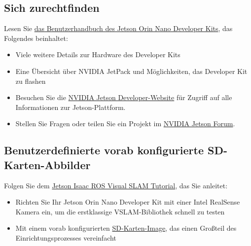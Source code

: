 \documentclass{article}
\begin{document}
\subsection*{Sich zurechtfinden}

Lesen Sie \textcolor{blue}{\href{https://developer.nvidia.com/embedded/learn/jetson-orin-nano-devkit-user-guide/index.html}{das Benutzerhandbuch des Jetson Orin Nano Developer Kits}}, das Folgendes beinhaltet:
\begin{itemize}
    \item Viele weitere Details zur Hardware des Developer Kits
    \item Eine Übersicht über NVIDIA JetPack und Möglichkeiten, das Developer Kit zu flashen
    \item Besuchen Sie die \textcolor{blue}{\href{https://developer.nvidia.com/embedded-computing}{NVIDIA Jetson Developer-Website}} für Zugriff auf alle Informationen zur Jetson-Plattform.
    \item Stellen Sie Fragen oder teilen Sie ein Projekt im \textcolor{blue}{\href{https://forums.developer.nvidia.com/c/agx-autonomous-machines/jetson-embedded-systems/70}{NVIDIA Jetson Forum}}.
\end{itemize}
\subsection{Benutzerdefinierte vorab konfigurierte SD-Karten-Abbilder}
Folgen Sie dem \textcolor{blue}{\href{https://nvidia-ai-iot.github.io/jetson_isaac_ros_visual_slam_tutorial/}{Jetson Isaac ROS Visual SLAM Tutorial}}, das Sie anleitet:
\begin{itemize}
    \item Richten Sie Ihr Jetson Orin Nano Developer Kit mit einer Intel RealSense Kamera ein, um die erstklassige VSLAM-Bibliothek schnell zu testen
    \item Mit einem vorab konfigurierten \textcolor{blue}{\href{https://nvidia-ai-iot.github.io/jetson_isaac_ros_visual_slam_tutorial/}{SD-Karten-Image}}, das einen Großteil des Einrichtungsprozesses vereinfacht
\end{itemize}
\end{document}
